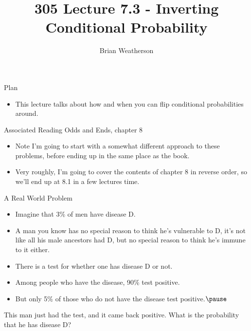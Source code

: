 \documentclass[
  ignorenonframetext,
]{beamer}
\title{305 Lecture 7.3 - Inverting Conditional Probability}
\author{Brian Weatherson}
\date{}
\providecommand{\tightlist}{%
  \setlength{\itemsep}{0pt}\setlength{\parskip}{0pt}}
\renewcommand{\,}{\text{, }}
\begin{document}
\frame{\titlepage}

\begin{frame}{Plan}
\protect\hypertarget{plan}{}
\begin{itemize}
\tightlist
\item
  This lecture talks about how and when you can flip conditional
  probabilities around.
\end{itemize}
\end{frame}

\begin{frame}{Associated Reading}
\protect\hypertarget{associated-reading}{}
Odds and Ends, chapter 8

\begin{itemize}
\tightlist
\item
  Note I'm going to start with a somewhat different approach to these
  problems, before ending up in the same place as the book.
\item
  Very roughly, I'm going to cover the contents of chapter 8 in reverse
  order, so we'll end up at 8.1 in a few lectures time.
\end{itemize}
\end{frame}

\begin{frame}{A Real World Problem}
\protect\hypertarget{a-real-world-problem}{}
\begin{itemize}
\tightlist
\item
  Imagine that 3\% of men have disease D.
\item
  A man you know has no special reason to think he's vulnerable to D,
  it's not like all his male ancestors had D, but no special reason to
  think he's immune to it either.
\item
  There is a test for whether one has disease D or not.
\item
  Among people who have the disease, 90\% test positive.
\item
  But only 5\% of those who do not have the disease test
  positive.\(\pause\)
\end{itemize}

This man just had the test, and it came back positive. What is the
probability that he has disease D?
\end{frame}
\end{document}
